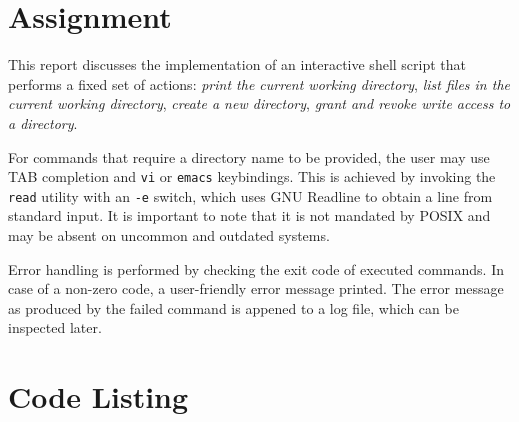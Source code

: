 \documentclass[en, listings]{labreport}
\begin{document}
\maketitlepage

\section*{Assignment}

This report discusses the implementation of an interactive shell script that
performs a fixed set of actions: \textit{print the current working directory},
\textit{list files in the current working directory}, \textit{create a new directory},
\textit{grant and revoke write access to a directory}.

For commands that require a directory name to be provided, the user may use
TAB completion and \texttt{vi} or \texttt{emacs} keybindings. This is achieved by invoking
the \texttt{read} utility with an \verb|-e| switch, which uses GNU Readline to obtain a line
from standard input. It is important to note that it is not mandated by POSIX and may be
absent on uncommon and outdated systems.

Error handling is performed by checking the exit code of executed commands.
In case of a non-zero code, a user-friendly error message printed. The error message
as produced by the failed command is appened to a log file, which can be inspected later.

\section*{Code Listing}


\end{document}
